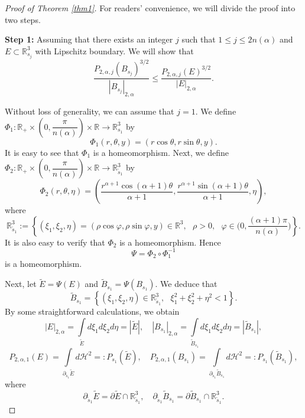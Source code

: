\documentclass[10pt, reqno]{amsart}
\begin{document}
	\begin{proof}[Proof of Theorem \ref{thm1}]
		For readers' convenience, we will divide the proof into two steps.
		
		\noindent\textbf{Step 1:} Assuming that there exists an integer $j$ such that $1\leq j\leq 2n(\alpha)$ and $E \subset \mathbb{R}^3_{s_j}$ with Lipschitz boundary. We will show that
		\begin{equation}\label{eqn6}
			\dfrac{P_{2,\alpha,j}(B_{s_j})^{3/2}}{|B_{s_j}|_{2,\alpha}} \leq \dfrac{P_{2,\alpha,j}(E)^{3/2}}{|E|_{2,\alpha}}.
		\end{equation}
		
		Without loss of generality, we can assume that $j=1$. We define $\Phi_1: \mathbb{R}_+ \times \left( 0, \dfrac{\pi}{n(\alpha)} \right) \times \mathbb{R} \to \mathbb{R}^3_{s_1}$ by
		$$ \Phi_1 (r, \theta, y) = (r\cos \theta, r\sin \theta, y).$$
		It is easy to see that $\Phi_1$ is a homeomorphism. Next, we define $\Phi_2: \mathbb{R}_+ \times \left( 0, \dfrac{\pi}{n(\alpha)} \right) \times \mathbb{R} \to \mathbb{R}^3_{\widetilde{s}_1}$ by
		$$ \Phi_2 (r, \theta, \eta) = \left(\dfrac{r^{\alpha+1}\cos (\alpha+1)\theta}{\alpha+1}, \dfrac{r^{\alpha+1}\sin(\alpha+1)\theta}{\alpha+1}, \eta\right), $$
		where
		$$\mathbb{R}^3_{\widetilde{s}_1} := \left\{(\xi_1,\xi_2,\eta) = (\rho\cos\varphi, \rho\sin\varphi, y) \in \mathbb{R}^3, \textrm{ } \rho >0, \textrm{ } \varphi \in \Big(0,\frac{(\alpha+1)\pi}{n(\alpha)}\Big) \right\}.$$
		It is also easy to verify that $\Phi_2$ is a homeomorphism. Hence
		$$ \Psi = \Phi_2 \circ \Phi_1^{-1} $$
		is a homeomorphism. 
		
		Next, let $\widetilde{E} = \Psi (E)$ and $\widetilde{B}_{s_1} = \Psi(B_{s_1})$. We deduce that
		$$ \widetilde{B}_{s_1} = \left\{ (\xi_1, \xi_2, \eta) \in \mathbb{R}^3_{\widetilde{s}_1}, \textrm{ } \xi_1^2 + \xi_2^2 + \eta^2 < 1\right\}.$$
		By some straightforward calculations, we obtain
		$$ |E|_{2,\alpha} = \int\limits_{\widetilde{E}} d\xi_1d\xi_2d\eta = |\widetilde{E}|, \quad |B_{s_1}|_{2,\alpha} = \int\limits_{\widetilde{B}_{s_1}} d\xi_1d\xi_2d\eta = |\widetilde{B}_{s_1}|, $$
		$$ P_{2,\alpha,1} (E) = \int\limits_{\partial_{\widetilde{s}_1} \widetilde{E}} d\mathcal{H}^2 =: P_{s_1}(\widetilde{E}), \quad P_{2,\alpha,1} (B_{s_1}) = \int\limits_{\partial_{\widetilde{s}_1} \widetilde{B}_{s_1}} d\mathcal{H}^2 =: P_{s_1}( \widetilde{B}_{s_1}),$$
		where
		$$ \partial_{\widetilde{s}_1} \widetilde{E} = \partial \widetilde{E} \cap \mathbb{R}^3_{\widetilde{s}_1}, \quad \partial_{\widetilde{s}_1} \widetilde{B}_{s_1} = \partial \widetilde{B}_{s_1} \cap \mathbb{R}^3_{\widetilde{s}_1}.$$
		

\end{proof}
\end{document}
